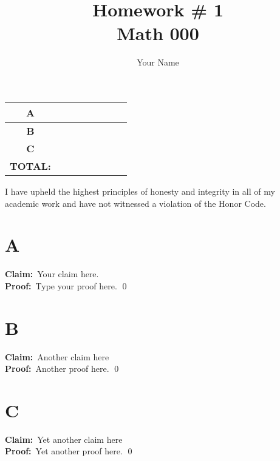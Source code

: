 \documentclass[12PT]{article}
\title{Homework \# 1\\ Math 000}
\author{Your Name}
\newcommand{\Proof}{\\\noindent\textbf{Proof:}\ }
\newcommand{\Claim}{\noindent\textbf{Claim:}\ }
\newcommand{\prob}[1]{\newpage\section*{#1}}
\begin{document}
\maketitle


\begin{center}
  \begin{tabular}{| c | c |}
    \hline
    \textbf{A}    & \ \ \ \ \ \ \ \ \ \ \ \\ \hline
    \textbf{B}    &                       \\\hline
    \textbf{C}    &                       \\\hline\hline
    \textbf{TOTAL:} &                     \\\hline
  \end{tabular}
\end{center}




\vfill


\begin{center}
  I have upheld the highest principles of honesty and integrity in all of my academic work and have not witnessed a violation of the Honor Code.
  
\end{center}






\prob{A}

\Claim Your claim here.
\Proof Type your proof here.
\qed







\prob{B}

\Claim Another claim here
\Proof Another proof here.
\qed




\prob{C}

\Claim Yet another claim here
\Proof Yet another proof here.
\qed
\end{document}
